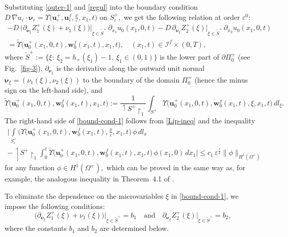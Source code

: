 \documentclass[reqno]{amsart}            %
\numberwithin{equation}{section}
\begin{document}
	
	Substituting \eqref{outer-1} and \eqref{regul} into the boundary condition $D \, \nabla u_{\varepsilon} \cdot \boldsymbol{\nu}_\varepsilon =  \Upsilon\big(\mathbf{u}^+_\varepsilon, \mathbf{u}^f_\varepsilon, \tfrac{x}{\varepsilon}, x_1, t \big)$ on $S^+_\varepsilon,$ 
	we get the following relation at order $\varepsilon^0:$
	\begin{multline}\label{bound-cond-1}
		- D \, \Big(\partial_{\boldsymbol{\nu}_\xi}Z^+_1(\xi) + \nu_1(\xi)\Big)\Big|_{\xi \in \tilde{S}^+} \, \partial_{x_1}{u}_0(x_1,0,t)
		- D \, \partial_{\boldsymbol{\nu}_\xi}Z^+_2(\xi)\Big|_{\xi \in \tilde{S}^+}\,  \partial_{x_2}{u}_0(x_1,0,t)
		\\
		=  \widetilde{\Upsilon}\big(\mathbf{u}^+_0(x_1,0,t), \mathbf{w}^f_0(x_1,t), x_1, t \big), \quad (x_1, t) \in \mathcal{I}^f \times (0, T),
	\end{multline}
	where $\tilde{S}^+:= \{\xi\colon\ \xi_2=h_+(\xi_1) -1, \ \xi_1 \in (0,1) \}$ is the lower part of $\partial\Pi^+_0$ (see Fig.~\ref{fig-3}),
	$\partial_{\boldsymbol{\nu}_\xi}$ is the derivative along the  outward unit normal $\boldsymbol{\nu}_\xi= (\nu_1(\xi), \nu_2(\xi))$ to the boundary of the domain $\Pi^+_0$ (hence the minus sign on the left-hand side), and
	\begin{equation}\label{eq-14}
		\widetilde{\Upsilon}\big(\mathbf{u}^+_0(x_1,0,t), \mathbf{w}^f_0(x_1,t), x_1, t \big) := 
		\frac{1}{\upharpoonleft\!\! {S}^+\!\!\upharpoonright_1}
		\int_{S^+}  \Upsilon\big(\mathbf{u}^+_0(x_1,0,t), \mathbf{w}^f_0(x_1,t), \xi, x_1, t \big) \,  dl_\xi .
	\end{equation}
	The right-hand side of \eqref{bound-cond-1} follows from \eqref{Lip-ineq} and the inequality
	\begin{multline}\label{eq-15}
		\bigg|\int\limits_{S^+_\varepsilon}\Big(\Upsilon\big(\mathbf{u}^+_0(x_1,0,t), \mathbf{w}^f_0(x_1,t), \tfrac{x}{\varepsilon}, x_1, t \big)
		\, \phi \, dl_x    
		\\
		- \upharpoonleft\!\! {S}^+\!\!\upharpoonright_1 \int_{0}^{\ell} \widetilde{\Upsilon}\big(\mathbf{u}^+_0(x_1,0,t), \mathbf{w}^f_0(x_1,t), x_1, t \big) \, \phi(x_1, 0) \, dx_1\bigg| \le c_1  \, \varepsilon^{\frac{1}{2}} \|\phi\|_{H^1(\Omega^+)} 
	\end{multline}
	for any function $\phi \in H^1(\Omega^+),$ which can be proved in the same way as, for example, the analogous inequality in Theorem~4.1 of \cite[\S 4, Chapt.~3]{Ole-Ios-Sha-1991}.
	
	To eliminate the dependence on the microvariables $\xi$ in \eqref{bound-cond-1}, we impose the following conditions: 
	\begin{equation}\label{eq-15+}
		\Big(\partial_{\boldsymbol{\nu}_\xi}Z^+_1(\xi) + \nu_1(\xi)\Big)\Big|_{\xi \in \tilde{S}^+} = b_1 \quad \text{and} \quad 
		\partial_{\boldsymbol{\nu}_\xi}Z^+_2(\xi)\Big|_{\xi \in \tilde{S}^+} = b_2,
	\end{equation}
	where the constants $b_1$ and $b_2$ are determined below. 
	 
\end{document}

